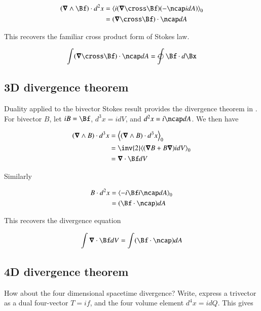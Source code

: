 \begin{align*}
( \spacegrad \wedge \Bf ) \cdot d^2 x
&=
\gpgradezero{ i (\spacegrad \cross \Bf) (- \ncap i dA) } \\
&=
(\spacegrad \cross \Bf) \cdot \ncap dA
\end{align*}

This recovers the familiar cross product form of Stokes law.

\begin{align}
\int (\spacegrad \cross \Bf) \cdot \ncap dA = \ointclockwise \Bf \cdot d\Bx
\end{align}

\subsection{3D divergence theorem}

Duality applied to the bivector Stokes result provides the divergence theorem in .  For bivector $B$, let $iB = \Bf$, $d^3 x = i dV$, and $d^2 x = i \ncap dA$.  We then have

\begin{align*}
( \spacegrad \wedge B ) \cdot d^3 x
&=
\gpgradezero{ ( \spacegrad \wedge B ) \cdot d^3 x } \\
&=
\inv{2} \gpgradezero{ ( \spacegrad B + B \spacegrad ) i dV } \\
&=
\spacegrad \cdot \Bf dV \\
\end{align*}

Similarly

\begin{align*}
B \cdot d^2 x
&=
\gpgradezero{ 
-i\Bf i \ncap dA
} \\
&=
(\Bf \cdot \ncap) dA
 \\
\end{align*}

This recovers the  divergence equation

\begin{align}
\int \spacegrad \cdot \Bf dV = \int (\Bf \cdot \ncap) dA
\end{align}

\subsection{4D divergence theorem}

How about the four dimensional spacetime divergence?  Write, express a trivector as a dual four-vector $T = if$, and the four volume element $d^4 x = i dQ$.  This gives

